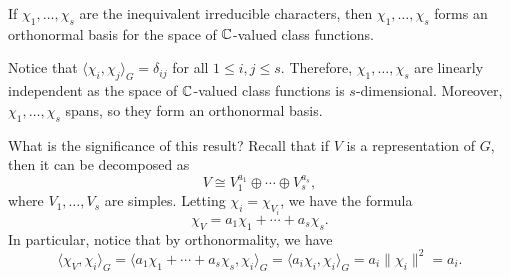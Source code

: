 \begin{theo}{}
    If $\chi_1, \dots, \chi_s$ are the inequivalent irreducible characters, then 
    $\chi_1, \dots, \chi_s$ forms an orthonormal basis for the space of 
    $\mathbb{C}$-valued class functions. 
\end{theo}
\begin{pf}
    Notice that $\langle \chi_i, \chi_j \rangle_G = \delta_{ij}$ for all 
    $1 \leq i, j \leq s$. Therefore, $\chi_1, \dots, \chi_s$ are linearly 
    independent as the space of $\mathbb{C}$-valued class functions is $s$-dimensional. 
    Moreover, $\chi_1, \dots, \chi_s$ spans, so they form an orthonormal basis. 
\end{pf}

What is the significance of this result? Recall that if $V$ is a representation
of $G$, then it can be decomposed as 
\[ V \cong V_1^{a_1} \oplus \cdots \oplus V_s^{a_s}, \] 
where $V_1, \dots, V_s$ are simples. Letting $\chi_i = \chi_{V_i}$, 
we have the formula 
\[ \chi_V = a_1 \chi_1 + \cdots + a_s \chi_s. \] 
In particular, notice that by orthonormality, we have 
\[ \langle \chi_V, \chi_i \rangle_G = \langle a_1\chi_1 + \cdots + a_s\chi_s, 
\chi_i \rangle_G = \langle a_i \chi_i, \chi_i \rangle_G = a_i \|\chi_i\|^2 = a_i. \] 
